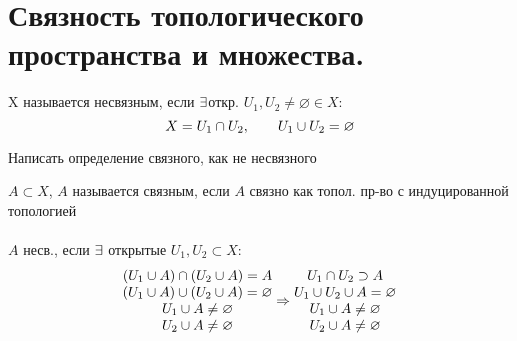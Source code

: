 \documentclass[geometry.tex]{subfiles}
\begin{document}
  \section{Связность топологического пространства и множества.}

  \begin{definition}
    X называется несвязным, если $\exists$откр. $U_1, U_2 \neq \varnothing \in X:$
    \[X = U_1 \cap U_2,\qquad U_1 \cup U_2 = \varnothing\]
  \end{definition}

  \begin{upr}
    Написать определение связного, как не несвязного
  \end{upr}

  \begin{definition}
    $A \subset X$, $A$ называется связным, если $A$ связно как топол. пр-во с индуцированной топологией\\ \ \\
    $A$ несв., если $\exists$ открытые $U_1, U_2 \subset X$:
    \[\begin{matrix}
      (U_1 \cup A) \cap (U_2 \cup A) = A\\
      (U_1 \cup A) \cup (U_2 \cup A) = \varnothing\\
      U_1 \cup A \neq \varnothing\\
      U_2 \cup A \neq \varnothing
    \end{matrix} \Rightarrow \begin{matrix}
      U_1 \cap U_2 \supset A\\
      U_1 \cup U_2 \cup A = \varnothing\\
      U_1 \cup A \neq \varnothing\\
      U_2 \cup A \neq \varnothing
    \end{matrix}\]
  \end{definition}
\end{document}
